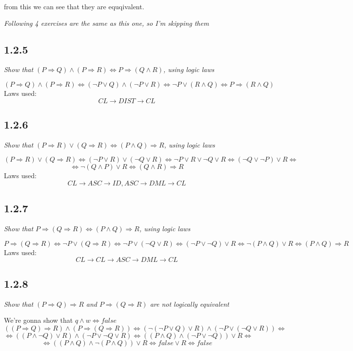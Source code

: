 \documentclass[11pt,oneside,titlepage]{book}
\DeclareMathOperator \eqv {\Leftrightarrow}
\DeclareMathOperator \imp {\Rightarrow}
\begin{document}
from this we can see that they are equqivalent.

\textit{Following 4 exercises are the same as this one, so I'm skipping them}

\subsection*{1.2.5}

\textit{Show that $(P \imp Q) \land (P \imp R) \eqv P \imp (Q \land R)$, using logic laws}

$$(P \imp Q) \land (P \imp R) \eqv (\neg P \lor Q) \land (\neg P \lor R) \eqv
\neg P  \lor (R \land Q) \eqv  P  \imp (R \land Q) $$
Laws used: 
$$CL \to DIST \to CL$$

\subsection*{1.2.6}

\textit{Show that $(P \imp R) \lor (Q \imp R) \eqv (P \land Q) \imp R$, using logic laws}

$$(P \imp R) \lor (Q \imp R)  \eqv (\neg P \lor R) \lor (\neg Q \lor R) \eqv
\neg P \lor R \lor \neg Q \lor R \eqv (\neg Q \lor \neg P) \lor R \eqv$$
$$ \eqv \neg (Q \land P) \lor R
\eqv (Q \land R) \imp R$$
Laws used:
$$CL \to ASC \to ID, ASC \to DML \to CL$$

\subsection*{1.2.7}

\textit{Show that $P \imp (Q \imp R) \eqv (P \land Q) \imp R$, using logic laws}

$$P \imp (Q \imp R) \eqv \neg P \lor (Q \imp R) \eqv \neg P \lor (\neg Q \lor R) \eqv
(\neg P \lor \neg Q) \lor R \eqv \neg (P \land Q) \lor R \eqv (P \land Q) \imp R$$
Laws used:
$$CL \to CL \to ASC \to DML \to CL$$

\subsection*{1.2.8}

\textit{Show that $(P \imp Q) \imp R$ and $P \imp (Q \imp R)$ are not logically equivalent}

We're gonna show that $q \land w \eqv false$
$$((P \imp Q) \imp R) \land (P \imp (Q \imp R)) \eqv (\neg (\neg P \lor Q) \lor R) \land
(\neg P \lor (\neg Q \lor R)) \eqv $$
$$\eqv ((P \land \neg Q) \lor R) \land (\neg P \lor \neg Q \lor R) \eqv
((P \land Q) \land (\neg P \lor \neg Q)) \lor R  \eqv$$
$$ \eqv ((P \land Q) \land \neg ( P \land  Q)) \lor R  \eqv false \lor R \eqv false$$
\end{document}

